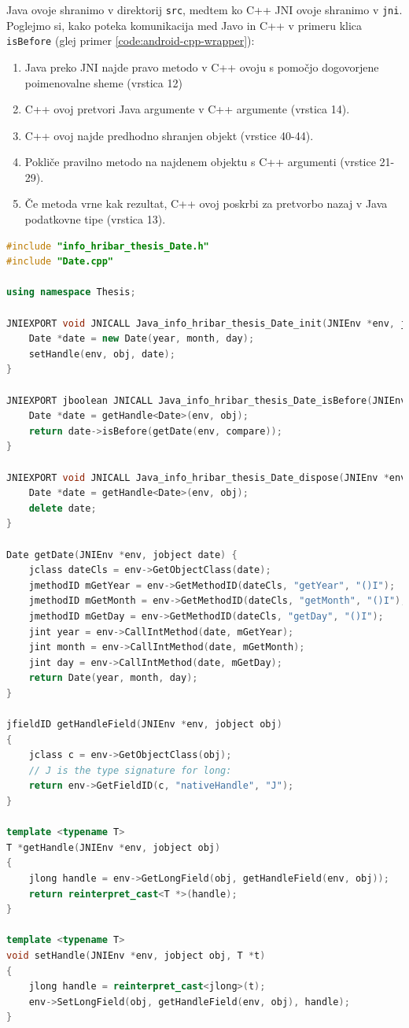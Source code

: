 Java ovoje shranimo v direktorij \texttt{src}, medtem ko C++ JNI ovoje shranimo v \texttt{jni}. Poglejmo si, kako poteka komunikacija med Javo in C++ v primeru klica \texttt{isBefore} (glej primer \ref{code:android-cpp-wrapper}):

\begin{enumerate}
  \item Java preko JNI najde pravo metodo v C++ ovoju s pomočjo dogovorjene poimenovalne sheme (vrstica 12)
  \item C++ ovoj pretvori Java argumente v C++ argumente (vrstica 14).
  \item C++ ovoj najde predhodno shranjen objekt (vrstice 40-44).
  \item Pokliče pravilno metodo na najdenem objektu s C++ argumenti (vrstice 21-29).
  \item Če metoda vrne kak rezultat, C++ ovoj poskrbi za pretvorbo nazaj v Java podatkovne tipe (vrstica 13).
\end{enumerate}

\begin{lstlisting}[caption={Primer mosta med jezikoma Java in C++ razreda \texttt{Date}.}, label=code:android-cpp-wrapper, language=C++]
#include "info_hribar_thesis_Date.h"
#include "Date.cpp"

using namespace Thesis;

JNIEXPORT void JNICALL Java_info_hribar_thesis_Date_init(JNIEnv *env, jobject obj, jint year, jint month, jint day) {
	Date *date = new Date(year, month, day);
	setHandle(env, obj, date);
}

JNIEXPORT jboolean JNICALL Java_info_hribar_thesis_Date_isBefore(JNIEnv *env, jobject obj, jobject compare) {
	Date *date = getHandle<Date>(env, obj);
	return date->isBefore(getDate(env, compare));
}

JNIEXPORT void JNICALL Java_info_hribar_thesis_Date_dispose(JNIEnv *env, jobject obj) {
	Date *date = getHandle<Date>(env, obj);
	delete date;
}

Date getDate(JNIEnv *env, jobject date) {
	jclass dateCls = env->GetObjectClass(date);
	jmethodID mGetYear = env->GetMethodID(dateCls, "getYear", "()I");
	jmethodID mGetMonth = env->GetMethodID(dateCls, "getMonth", "()I");
	jmethodID mGetDay = env->GetMethodID(dateCls, "getDay", "()I");
	jint year = env->CallIntMethod(date, mGetYear);
	jint month = env->CallIntMethod(date, mGetMonth);
	jint day = env->CallIntMethod(date, mGetDay);
	return Date(year, month, day);
}

jfieldID getHandleField(JNIEnv *env, jobject obj)
{
    jclass c = env->GetObjectClass(obj);
    // J is the type signature for long:
    return env->GetFieldID(c, "nativeHandle", "J");
}

template <typename T>
T *getHandle(JNIEnv *env, jobject obj)
{
    jlong handle = env->GetLongField(obj, getHandleField(env, obj));
    return reinterpret_cast<T *>(handle);
}

template <typename T>
void setHandle(JNIEnv *env, jobject obj, T *t)
{
    jlong handle = reinterpret_cast<jlong>(t);
    env->SetLongField(obj, getHandleField(env, obj), handle);
}
\end{lstlisting}

